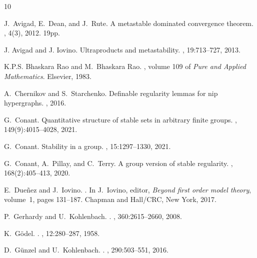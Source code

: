 \documentclass[11pt]{amsart}
\theoremstyle{definition}
\theoremstyle{remark}
\begin{document}
\begin{thebibliography}{10}

J.~Avigad, E.~Dean, and J.~Rute.
\newblock A metastable dominated convergence theorem.
, 4(3), 2012.
\newblock 19pp.

J. Avigad and J. Iovino.
\newblock Ultraproducts and metastability.
, 19:713--727, 2013.

K.P.S. {Bhaskara Rao} and M.~{Bhaskara Rao}.
, volume 109 of {\em Pure and Applied
  Mathematics}.
\newblock Elsevier, 1983.

A.~Chernikov and S.~Starchenko.
\newblock Definable regularity lemmas for nip hypergraphs.
, 2016.

G.~Conant.
\newblock Quantitative structure of stable sets in arbitrary finite groups.
,
  149(9):4015--4028, 2021.

G.~Conant.
\newblock Stability in a group.
, 15:1297--1330, 2021.

G.~Conant, A.~Pillay, and C.~Terry.
\newblock A group version of stable regularity.
, 168(2):405--413, 2020.

E.~Due{\~n}ez and J.~Iovino.
.
\newblock In J.~Iovino, editor, {\em {Beyond first order model theory}},
  volume~1, pages 131--187. Chapman and Hall/CRC, New York, 2017.

P.~Gerhardy and U.~Kohlenbach.
.
,
  360:2615--2660, 2008.

K.~G{\"o}del.
.
, 12:280--287, 1958.

D.~G\"unzel and U.~Kohlenbach.
.
, 290:503--551, 2016.


\end{thebibliography}
\end{document}
